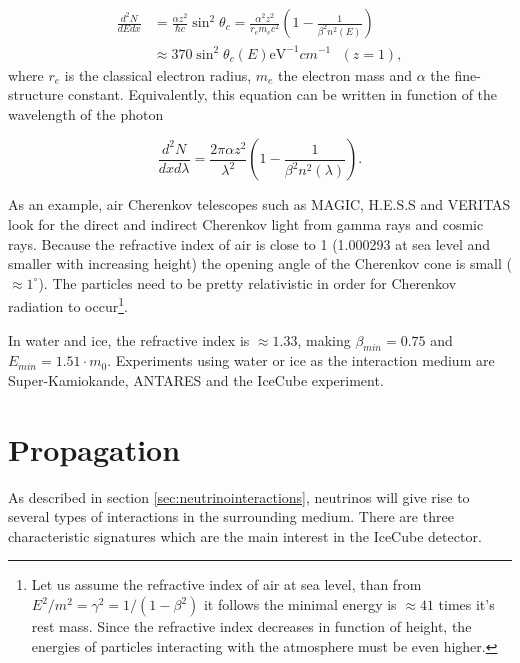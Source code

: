 \begin{equation}
\begin{split}
\frac{d^2N}{dE dx} &= \frac{\alpha z^2}{\hbar c} \sin^2 \theta_c = \frac{\alpha^2 z^2}{r_e m_e c^2} \left( 1 - \frac{1}{\beta^2 n^2\left(E\right)} \right)\\
&\approx 370 \sin^2 \theta_c \left(E\right) \textrm{eV}^{-1} cm^{-1} \ \ \ \left( z =1\right),
\end{split}
\end{equation}
where $r_e$ is the classical electron radius, $m_e$ the electron mass and $\alpha$ the fine-structure constant. Equivalently, this equation can be written in function of the wavelength of the photon

\begin{equation}
\label{eq:franktamm}
\frac{d^2N}{dx d\lambda}  = \frac{2\pi \alpha z^2}{\lambda^2} \left(1- \frac{1}{\beta^2 n^2 \left(\lambda \right)} \right).
\end{equation}

As an example, air Cherenkov telescopes such as MAGIC, H.E.S.S and VERITAS look for the direct and indirect Cherenkov light from gamma rays and cosmic rays. Because the refractive index of air is close to 1 (1.000293 at sea level and smaller with increasing height) the opening angle of the Cherenkov cone is small ($\approx 1^{\circ}$). The particles need to be pretty relativistic in order for Cherenkov radiation to occur\footnote{Let us assume the refractive index of air at sea level, than from $E^2/m^2 = \gamma^2 = 1/(1-\beta^2)$ it follows the minimal energy is $\approx 41$ times it's rest mass. Since the refractive index decreases in function of height, the energies of particles interacting with the atmosphere must be even higher.}.

In water and ice, the refractive index is $\approx 1.33$, making $\beta_{min} = 0.75$ and $E_{min} = 1.51 \cdot m_0$. Experiments using water or ice as the interaction medium are Super-Kamiokande, ANTARES and the IceCube experiment.
\section{Propagation}
As described in section \ref{sec:neutrinointeractions}, neutrinos will give rise to several types of interactions in the surrounding medium. There are three characteristic signatures which are the main interest in the IceCube detector.

